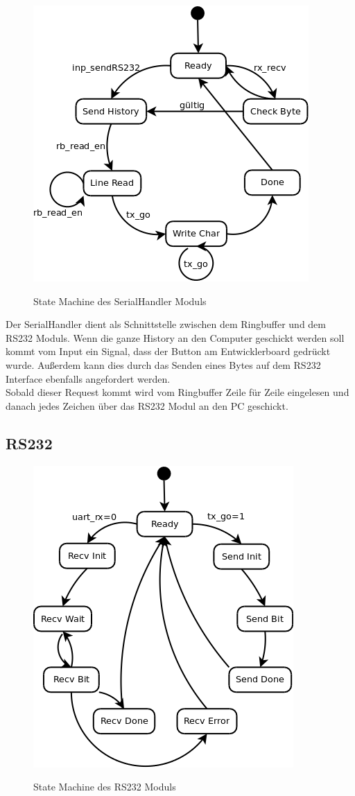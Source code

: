 \begin{figure}[!ht]
 \caption{State Machine des SerialHandler Moduls}
 \centering
 \includegraphics[scale=0.5]{pics/SerialHandler.png}
 \label{fig:Modules}
\end{figure}

Der SerialHandler dient als Schnittstelle zwischen dem Ringbuffer und dem RS232 Moduls. Wenn die ganze
History an den Computer geschickt werden soll kommt vom Input ein Signal, dass der Button am Entwicklerboard
gedrückt wurde. Außerdem kann dies durch das Senden eines Bytes auf dem RS232 Interface ebenfalls angefordert
werden.\\
Sobald dieser Request kommt wird vom Ringbuffer Zeile für Zeile eingelesen und danach jedes Zeichen
über das RS232 Modul an den PC geschickt.

\subsection{RS232}

\begin{figure}[!ht]
 \caption{State Machine des RS232 Moduls}
 \centering
 \includegraphics[scale=0.5]{pics/RS232.png}
 \label{fig:Modules}
\end{figure}

